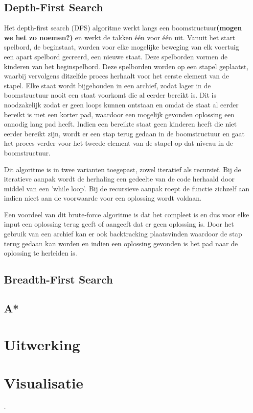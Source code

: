 \documentclass[a4paper]{article}
\begin{document}
\subsection{Depth-First Search}
Het depth-first search (DFS) algoritme werkt langs een boomstructuur\textbf{(mogen we het zo noemen?)} en werkt de takken één voor één uit. Vanuit het start spelbord, de beginstaat, worden voor elke mogelijke beweging van elk voertuig een apart spelbord gecreerd, een nieuwe staat. Deze spelborden vormen de kinderen van het beginspelbord. Deze spelborden worden op een stapel geplaatst, waarbij vervolgens ditzelfde proces herhaalt voor het eerste element van de stapel. Elke staat wordt bijgehouden in een archief, zodat lager in de boomstructuur nooit een staat voorkomt die al eerder bereikt is. Dit is noodzakelijk zodat er geen loops kunnen ontstaan en omdat de staat al eerder bereikt is met een korter pad, waardoor een mogelijk gevonden oplossing een onnodig lang pad heeft. Indien een bereikte staat geen  kinderen heeft die niet eerder bereikt zijn, wordt er een stap terug gedaan in de boomstructuur en gaat het proces verder voor het tweede element van de stapel op dat niveau in de boomstructuur.

	Dit algoritme is in twee varianten toegepast, zowel iteratief als recursief. Bij de iteratieve aanpak wordt de herhaling een gedeelte van de code herhaald door middel van een 'while loop'. Bij de recursieve aanpak roept de functie zichzelf aan indien nieet aan de voorwaarde voor een oplossing wordt voldaan. 
    
    Een voordeel van dit brute-force algoritme is dat het compleet is en dus voor elke input een oplossing terug geeft of aangeeft dat er geen oplossing is. Door het gebruik van een archief kan er ook backtracking plaatsvinden waardoor de stap terug gedaan kan worden en indien een oplossing gevonden is het pad naar de oplossing te herleiden is.  
	
\subsection{Breadth-First Search}

\subsection{A*}

\section{Uitwerking}


\section{Visualisatie}


 \cite{greenwade93}. 



\end{document}
